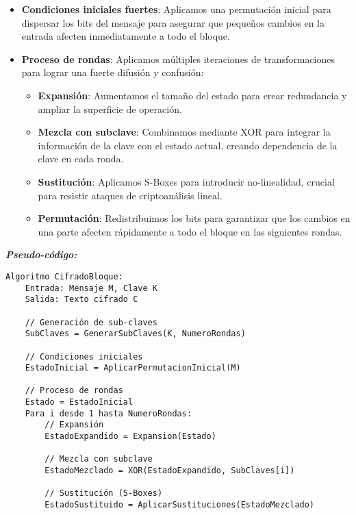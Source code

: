 {\begin{itemize}
    \item \textbf{Condiciones iniciales fuertes}: Aplicamos una permutación inicial para dispersar los bits del mensaje para asegurar que pequeños cambios en la entrada afecten inmediatamente a todo el bloque.
    
    \item \textbf{Proceso de rondas}: Aplicamos múltiples iteraciones de transformaciones para lograr una fuerte difusión y confusión:
        \begin{itemize}
            \item \textbf{Expansión}: Aumentamos el tamaño del estado para crear redundancia y ampliar la superficie de operación.
            
            \item \textbf{Mezcla con subclave}: Combinamos mediante XOR para integrar la información de la clave con el estado actual, creando dependencia de la clave en cada ronda.
            
            \item \textbf{Sustitución}: Aplicamos S-Boxes para introducir no-linealidad, crucial para resistir ataques de criptoanálisis lineal.
            
            \item \textbf{Permutación}: Redistribuimos los bits para garantizar que los cambios en una parte afecten rápidamente a todo el bloque en las siguientes rondas.
        \end{itemize}
\end{itemize}

\textbf{\textit{Pseudo-código:}}

\begin{lstlisting}[basicstyle=\ttfamily\small]
Algoritmo CifradoBloque:
    Entrada: Mensaje M, Clave K
    Salida: Texto cifrado C
    
    // Generación de sub-claves
    SubClaves = GenerarSubClaves(K, NumeroRondas)
    
    // Condiciones iniciales
    EstadoInicial = AplicarPermutacionInicial(M)
    
    // Proceso de rondas
    Estado = EstadoInicial
    Para i desde 1 hasta NumeroRondas:
        // Expansión
        EstadoExpandido = Expansion(Estado)
        
        // Mezcla con subclave
        EstadoMezclado = XOR(EstadoExpandido, SubClaves[i])
        
        // Sustitución (S-Boxes)
        EstadoSustituido = AplicarSustituciones(EstadoMezclado)
        

\end{lstlisting}}
